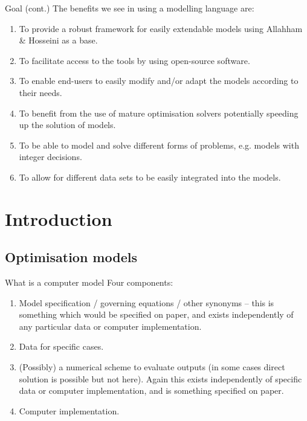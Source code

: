 \documentclass[handout]{beamer}
\begin{document}
\begin{frame}[t]{Goal (cont.)}
  \vspace{0.5cm}
  The benefits we see in using a modelling language are:\\[12pt]

  \begin{enumerate}
    \item To provide a robust framework for easily extendable models using Allahham \& Hosseini as a base.
    \item To facilitate access to the tools by using open-source software.
    \item To enable end-users to easily modify and/or adapt the models according to their needs.
    \item To benefit from the use of mature optimisation solvers potentially speeding up the solution of models.
    \item To be able to model and solve different forms of problems, e.g. models with integer decisions.
    \item To allow for different data sets to be easily integrated into the models.
  \end{enumerate}

\end{frame}



\section{Introduction}

\subsection*{Optimisation models}

\begin{frame}[t]{What is a computer model}
  \vspace{0.5cm}
  Four components:\\[12pt]

  \begin{enumerate}
    \item Model specification / governing equations / other synonyms -- this is something which would be specified on paper, and exists independently of any particular data or computer implementation.
    \item Data for specific cases.
    \item (Possibly) a numerical scheme to evaluate outputs (in some cases direct solution is possible but not here). Again this exists independently of specific data or computer implementation, and is something specified on paper.
    \item Computer implementation.
  \end{enumerate}

\end{frame}
\end{document}
